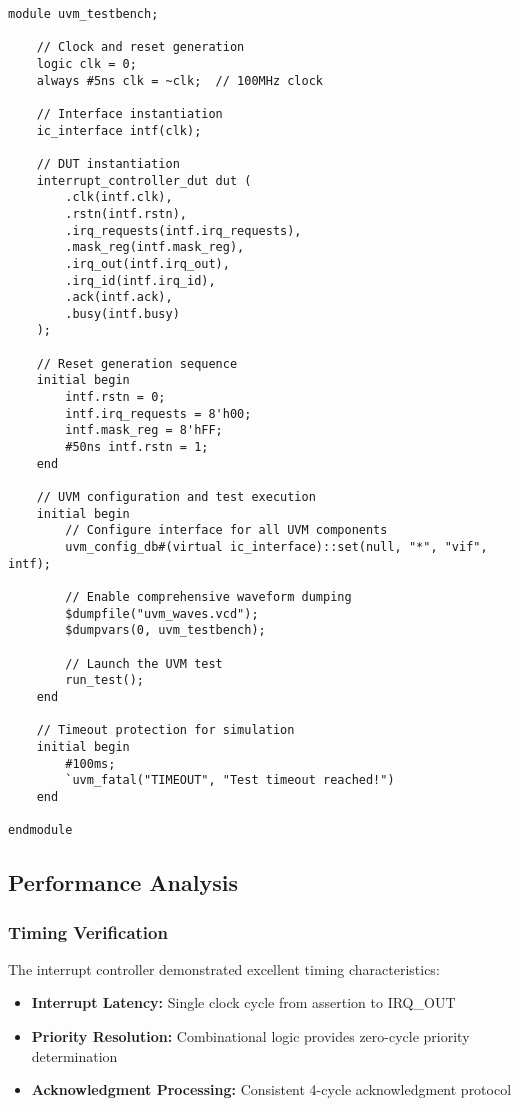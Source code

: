 \documentclass[12pt,a4paper]{article}
\begin{document}
\begin{lstlisting}[caption=Top-Level Testbench Module, label=lst:top_testbench]
module uvm_testbench;
    
    // Clock and reset generation
    logic clk = 0;
    always #5ns clk = ~clk;  // 100MHz clock
    
    // Interface instantiation
    ic_interface intf(clk);
    
    // DUT instantiation
    interrupt_controller_dut dut (
        .clk(intf.clk),
        .rstn(intf.rstn),
        .irq_requests(intf.irq_requests),
        .mask_reg(intf.mask_reg),
        .irq_out(intf.irq_out),
        .irq_id(intf.irq_id),
        .ack(intf.ack),
        .busy(intf.busy)
    );
    
    // Reset generation sequence
    initial begin
        intf.rstn = 0;
        intf.irq_requests = 8'h00;
        intf.mask_reg = 8'hFF;
        #50ns intf.rstn = 1;
    end
    
    // UVM configuration and test execution
    initial begin
        // Configure interface for all UVM components
        uvm_config_db#(virtual ic_interface)::set(null, "*", "vif", intf);
        
        // Enable comprehensive waveform dumping
        $dumpfile("uvm_waves.vcd");
        $dumpvars(0, uvm_testbench);
        
        // Launch the UVM test
        run_test();
    end
    
    // Timeout protection for simulation
    initial begin
        #100ms;
        `uvm_fatal("TIMEOUT", "Test timeout reached!")
    end
    
endmodule
\end{lstlisting}



\subsection{Performance Analysis}
\subsubsection{Timing Verification}
The interrupt controller demonstrated excellent timing characteristics:
\begin{itemize}
    \item \textbf{Interrupt Latency:} Single clock cycle from assertion to IRQ\_OUT
    \item \textbf{Priority Resolution:} Combinational logic provides zero-cycle priority determination
    \item \textbf{Acknowledgment Processing:} Consistent 4-cycle acknowledgment protocol
\end{itemize}
\end{document}
